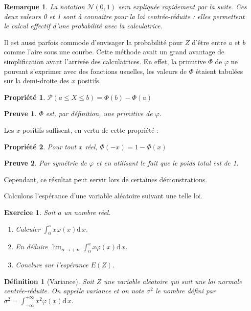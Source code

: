 \documentclass[11pt,a4paper,french]{article}
\newcommand{\diff}[1]{\mathrm{d}\,#1}
\newcommand{\p}{\mathcal{P}}
\theoremstyle{break}
\newtheorem{definition}{Définition}
\newtheorem{propriete}{Propriété}
\theoremstyle{plain}
\newtheorem{exerciceT}{Exercice}
\theoremstyle{nonumberplain}
\newtheorem{remarque}{Remarque}
\newtheorem{preuve}{Preuve}
\theoremstyle{nonumberbreak}
\newenvironment{exercice}{\begin{framed}\begin{exerciceT}}{\end{exerciceT}\end{framed}}
\begin{document}
\begin{remarque} La notation $\mathcal{N}(0,1)$ sera expliquée
  rapidement par la suite. Ces deux valeurs 0 et 1 sont à connaître pour
  la loi centrée-réduite : elles permettent le calcul effectif d'une
  probabilité avec la calculatrice.
\end{remarque}

Il est aussi parfois commode d'envisager la probabilité pour $Z$ d'être
entre $a$ et $b$ comme l'aire sous une courbe. Cette méthode avait un
grand avantage de simplification avant l'arrivée des calculatrices. En
effet, la primitive $\Phi$ de $\varphi$ ne pouvant s'exprimer avec des
fonctions usuelles, les valeurs de $\Phi$ étaient tabulées sur la
demi-droite des $x$ positifs.

\begin{propriete}
  $\p(a \leqslant X \leqslant b) = \Phi(b) - \Phi(a)$
\end{propriete}
\begin{preuve}
  $\Phi$ est, par définition, une primitive de $\varphi$.
\end{preuve}

Les $x$ positifs suffisent, en vertu de cette propriété :

\begin{propriete}
  Pour tout $x$ réel, $\Phi(-x) = 1 - \Phi(x)$
\end{propriete}
\begin{preuve}
  Par symétrie de $\varphi$ et en utilisant le fait que le poids total
  est de 1.
\end{preuve}

Cependant, ce résultat peut servir lors de certaines démonstrations.

Calculons l'espérance d'une variable aléatoire suivant une telle loi.

\begin{exercice}
  Soit $a$ un nombre réel.
  \begin{enumerate}
    \item Calculer $\int_0^a x\varphi(x) \diff x$.
    \item En déduire $\lim_{a\to+\infty} \int_0^a x\varphi(x) \diff x$.
    \item Conclure sur l'espérance $E(Z)$.
  \end{enumerate}
\end{exercice}

\begin{definition}[Variance]
  Soit $Z$ une variable aléatoire qui suit une loi normale
  centrée-réduite. On appelle \emph{variance} et on note $\sigma^2$ le
  nombre défini par $\sigma^2 = \int_{-\infty}^{+\infty} x^2\varphi(x)
  \diff x$.
\end{definition}
\end{document}
